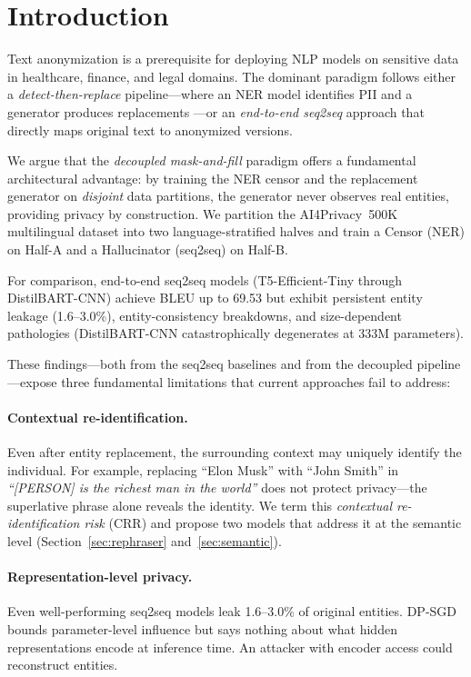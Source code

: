 \documentclass[11pt,a4paper]{article}
\begin{document}
\section{Introduction}
\label{sec:intro}

Text anonymization is a prerequisite for deploying NLP models on sensitive data
in healthcare, finance, and legal domains.  The dominant paradigm follows either
a \emph{detect-then-replace} pipeline—where an NER model identifies PII and a
generator produces replacements \cite{lison2021anonymization,
pilán2022textanonymization}—or an \emph{end-to-end seq2seq} approach that
directly maps original text to anonymized versions.

We argue that the \emph{decoupled mask-and-fill} paradigm offers a
fundamental architectural advantage: by training the NER censor and the
replacement generator on \emph{disjoint} data partitions, the generator
never observes real entities, providing privacy by construction.  We
partition the AI4Privacy~500K multilingual dataset into two
language-stratified halves and train a Censor (NER) on Half-A and a
Hallucinator (seq2seq) on Half-B.

For comparison, end-to-end seq2seq models (T5-Efficient-Tiny through
DistilBART-CNN) achieve BLEU up to 69.53 but exhibit persistent entity
leakage (1.6--3.0\%), entity-consistency breakdowns, and
size-dependent pathologies (DistilBART-CNN catastrophically degenerates at
333M parameters).

These findings—both from the seq2seq baselines and from the decoupled
pipeline—expose three fundamental limitations that current approaches
fail to address:

\paragraph{Contextual re-identification.}
Even after entity replacement, the surrounding context may uniquely identify the
individual.  For example, replacing ``Elon Musk'' with ``John Smith'' in
\emph{``[PERSON] is the richest man in the world''} does not protect privacy—the
superlative phrase alone reveals the identity.  We term this \emph{contextual
re-identification risk} (CRR) and propose two models that address it at the
semantic level (Section~\ref{sec:rephraser} and~\ref{sec:semantic}).

\paragraph{Representation-level privacy.}
Even well-performing seq2seq models leak 1.6--3.0\% of original entities. DP-SGD
\cite{abadi2016deep} bounds parameter-level influence but says nothing about
what hidden representations encode at inference time.  An attacker with encoder
access \cite{carlini2021extracting} could reconstruct entities.
\end{document}
